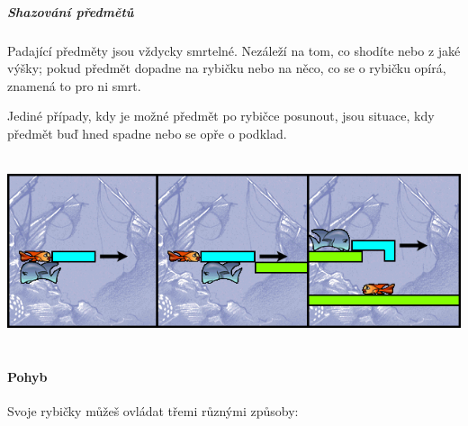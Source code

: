 \hypertarget{shazovuxe1nuxed-pux159edmux11btux16f}{%
\subparagraph{Shazování
předmětů}\label{shazovuxe1nuxed-pux159edmux11btux16f}}

Padající předměty jsou vždycky smrtelné. Nezáleží na tom, co shodíte
nebo z jaké výšky; pokud předmět dopadne na rybičku nebo na něco, co se
o rybičku opírá, znamená to pro ni smrt.

Jediné případy, kdy je možné předmět po rybičce posunout, jsou situace,
kdy předmět buď hned spadne nebo se opře o podklad.

\includegraphics[width=6.51042in,height=2.20833in]{falling_objects.png}

\hypertarget{pohyb}{%
\paragraph{Pohyb}\label{pohyb}}

Svoje rybičky můžeš ovládat třemi různými způsoby:

